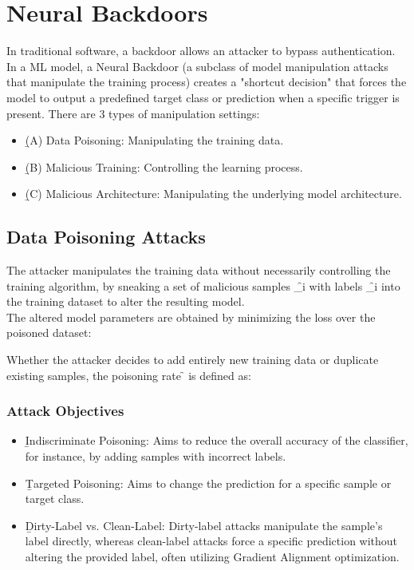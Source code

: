 \section{Neural Backdoors}

In traditional software, a backdoor allows an attacker to bypass authentication. In a ML model, a Neural Backdoor (a subclass of model manipulation attacks that manipulate the training process) creates a "shortcut decision" that forces the model to output a predefined target class or prediction when a specific trigger is present. There are 3 types of manipulation settings:
\begin{itemize}
\item \b{(A) Data Poisoning}: Manipulating the training data.
\item \b{(B) Malicious Training}: Controlling the learning process.
\item \b{(C) Malicious Architecture}: Manipulating the underlying model architecture.
\end{itemize}




\subsection{Data Poisoning Attacks}
The attacker manipulates the training data without necessarily controlling the training algorithm, by sneaking a set of malicious samples \f{_i} with labels \f{_i} into the training dataset to alter the resulting model.\\
The altered model parameters are obtained by minimizing the loss over the poisoned dataset:

Whether the attacker decides to add entirely new training data or duplicate existing samples, the poisoning rate \f{\rho} is defined as:

\subsubsection{Attack Objectives}
\begin{itemize}
\item \b{Indiscriminate Poisoning}: Aims to reduce the overall accuracy of the classifier, for instance, by adding samples with incorrect labels.
\item \b{Targeted Poisoning}: Aims to change the prediction for a specific sample or target class.
\item \b{Dirty-Label vs. Clean-Label}: Dirty-label attacks manipulate the sample's label directly, whereas clean-label attacks force a specific prediction without altering the provided label, often utilizing Gradient Alignment optimization.
\end{itemize}

